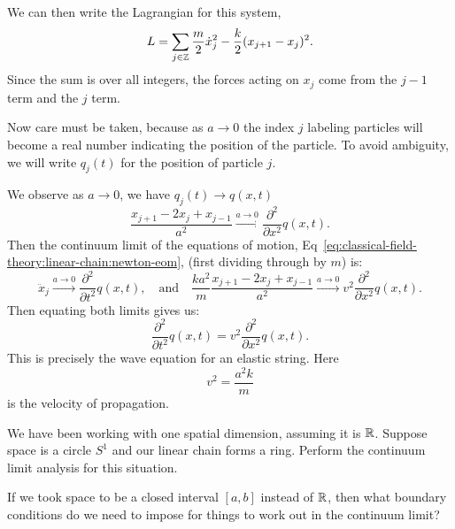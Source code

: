 We can then write the Lagrangian for this system,
\begin{equation}\label{eq:classical-field-theory:linear-chain:lagrangian-with-point-masses}
L = \sum_{j\in\mathbb{Z}}\frac{m}{2}\dot{x}^{2}_{j} - \frac{k}{2}(x_{j+1}-x_{j})^{2}.
\end{equation}
Since the sum is over all integers, the forces acting on $x_{j}$ come
from the $j-1$ term and the $j$ term.

Now care must be taken, because as $a\to 0$ the index $j$ labeling
particles will become a real number indicating the position of the
particle. To avoid ambiguity, we will write $q_{j}(t)$ for the position
of particle $j$.

We observe as $a\to0$, we have $q_{j}(t)\to q(x,t)$
\begin{equation}
\frac{x_{j+1}-2x_{j}+x_{j-1}}{a^{2}}\xrightarrow{a\to0}\frac{\partial^{2}}{\partial x^{2}}q(x,t).
\end{equation}
Then the continuum limit of the equations of motion,
Eq~\eqref{eq:classical-field-theory:linear-chain:newton-eom}, (first
dividing through by $m$) is:
\begin{equation}
\ddot{x}_{j}\xrightarrow{a\to0}\frac{\partial^{2}}{\partial t^{2}}q(x,t),
\quad\mbox{and}\quad\frac{ka^{2}}{m}\frac{x_{j+1}-2x_{j}+x_{j-1}}{a^{2}}
\xrightarrow{a\to0}v^{2}
\frac{\partial^{2}}{\partial x^{2}}q(x,t).
\end{equation}
Then equating both limits gives us:
\begin{equation}
\frac{\partial^{2}}{\partial t^{2}}q(x,t) = v^{2}
\frac{\partial^{2}}{\partial x^{2}}q(x,t).
\end{equation}
This is precisely the wave equation for an elastic string.
Here
\begin{equation}\label{eq:classical-field-theory:linear-chain:speed-of-propagation}
v^{2} = \frac{a^{2}k}{m}
\end{equation}
is the velocity of propagation.

\begin{exercise}
We have been working with one spatial dimension, assuming it is $\mathbb{R}$.
Suppose space is a circle $S^{1}$ and our linear chain forms a
ring. Perform the continuum limit analysis for this situation.
\end{exercise}

\begin{exercise}
If we took space to be a closed interval $[a,b]$ instead of $\mathbb{R}$,
then what boundary conditions do we need to impose for things to work
out in the continuum limit?
\end{exercise}

